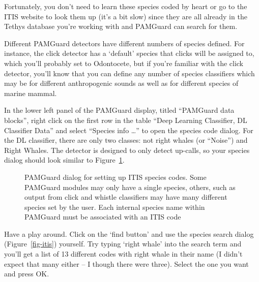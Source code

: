 \documentclass[
]{article}
\begin{document}
Fortunately, you don't need to learn these species coded by heart or go
to the ITIS website to look them up (it's a bit slow) since they are all
already in the Tethys database you're working with and PAMGuard can
search for them.

Different PAMGuard detectors have different numbers of species defined.
For instance, the click detector has a `default' species that clicks
will be assigned to, which you'll probably set to Odontocete, but if
you're familiar with the click detector, you'll know that you can define
any number of species classifiers which may be for different
anthropogenic sounds as well as for different species of marine mammal.

In the lower left panel of the PAMGuard display, titled ``PAMGuard data
blocks'', right click on the first row in the table ``Deep Learning
Classifier, DL Classifier Data'' and select ``Species info \ldots{}'' to
open the species code dialog. For the DL classifier, there are only two
classes: not right whales (or ``Noise'') and Right Whales. The detector
is designed to only detect up-calls, so your species dialog should look
similar to Figure~\ref{fig-speciescodes}.

\begin{figure}


\caption{\label{fig-speciescodes}PAMGuard dialog for setting up ITIS
species codes. Some PAMGuard modules may only have a single species,
others, such as output from click and whistle classifiers may have many
different species set by the user. Each internal species name within
PAMGuard must be associated with an ITIS code}

\end{figure}%

Have a play around. Click on the `find button' and use the species
search dialog (Figure~\ref{fig-itis}) yourself. Try typing `right whale'
into the search term and you'll get a list of 13 different codes with
right whale in their name (I didn't expect that many either -- I though
there were three). Select the one you want and press OK.
\end{document}

